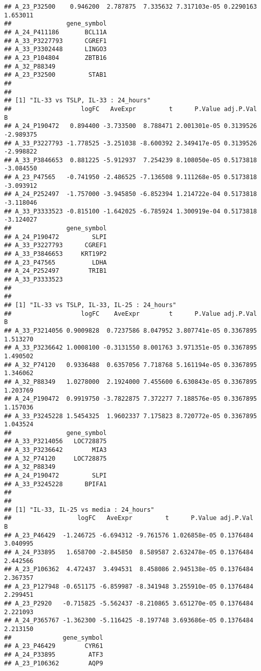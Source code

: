 \documentclass[
]{article}
\begin{document}
\begin{verbatim}
## A_23_P32500    0.946200  2.787875  7.335632 7.317103e-05 0.2290163 1.653011
##               gene_symbol
## A_24_P411186       BCL11A
## A_33_P3227793      CGREF1
## A_33_P3302448      LINGO3
## A_23_P104804       ZBTB16
## A_32_P88349              
## A_23_P32500         STAB1
## 
## 
## [1] "IL-33 vs TSLP, IL-33 : 24_hours"
##                   logFC   AveExpr         t      P.Value adj.P.Val         B
## A_24_P190472   0.894400 -3.733500  8.788471 2.001301e-05 0.3139526 -2.989375
## A_33_P3227793 -1.778525 -3.251038 -8.600392 2.349417e-05 0.3139526 -2.998822
## A_33_P3846653  0.881225 -5.912937  7.254239 8.108050e-05 0.5173818 -3.084550
## A_23_P47565   -0.741950 -2.486525 -7.136508 9.111268e-05 0.5173818 -3.093912
## A_24_P252497  -1.757000 -3.945850 -6.852394 1.214722e-04 0.5173818 -3.118046
## A_33_P3333523 -0.815100 -1.642025 -6.785924 1.300919e-04 0.5173818 -3.124027
##               gene_symbol
## A_24_P190472         SLPI
## A_33_P3227793      CGREF1
## A_33_P3846653     KRT19P2
## A_23_P47565          LDHA
## A_24_P252497        TRIB1
## A_33_P3333523            
## 
## 
## [1] "IL-33 vs TSLP, IL-33, IL-25 : 24_hours"
##                   logFC    AveExpr        t      P.Value adj.P.Val        B
## A_33_P3214056 0.9009828  0.7237586 8.047952 3.807741e-05 0.3367895 1.513270
## A_33_P3236642 1.0008100 -0.3131550 8.001763 3.971351e-05 0.3367895 1.490502
## A_32_P74120   0.9336488  0.6357056 7.718768 5.161194e-05 0.3367895 1.346062
## A_32_P88349   1.0278000  2.1924000 7.455600 6.630843e-05 0.3367895 1.203769
## A_24_P190472  0.9919750 -3.7822875 7.372277 7.188576e-05 0.3367895 1.157036
## A_33_P3245228 1.5454325  1.9602337 7.175823 8.720772e-05 0.3367895 1.043524
##               gene_symbol
## A_33_P3214056   LOC728875
## A_33_P3236642        MIA3
## A_32_P74120     LOC728875
## A_32_P88349              
## A_24_P190472         SLPI
## A_33_P3245228      BPIFA1
## 
## 
## [1] "IL-33, IL-25 vs media : 24_hours"
##                  logFC   AveExpr         t      P.Value adj.P.Val        B
## A_23_P46429  -1.246725 -6.694312 -9.761576 1.026858e-05 0.1376484 3.040995
## A_24_P33895   1.658700 -2.845850  8.589587 2.632478e-05 0.1376484 2.442566
## A_23_P106362  4.472437  3.494531  8.458086 2.945138e-05 0.1376484 2.367357
## A_23_P127948 -0.651175 -6.859987 -8.341948 3.255910e-05 0.1376484 2.299451
## A_23_P2920   -0.715825 -5.562437 -8.210865 3.651270e-05 0.1376484 2.221093
## A_24_P365767 -1.362300 -5.116425 -8.197748 3.693686e-05 0.1376484 2.213150
##              gene_symbol
## A_23_P46429        CYR61
## A_24_P33895         ATF3
## A_23_P106362        AQP9

\end{verbatim}
\end{document}
